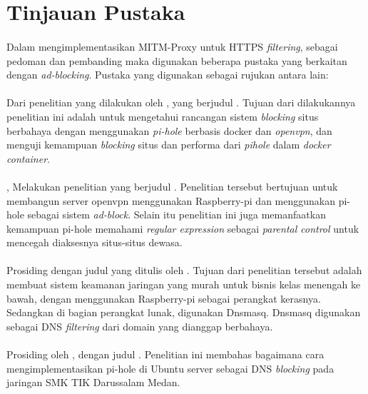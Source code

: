 \documentclass[./bab_2.tex]{subfiles}
\begin{document}
\section{Tinjauan Pustaka}
  \paragraph*{}Dalam mengimplementasikan MITM-Proxy untuk
  HTTPS \textit{filtering}, sebagai pedoman dan pembanding
  maka digunakan beberapa pustaka yang berkaitan dengan
  \textit{ad-blocking}. Pustaka yang digunakan sebagai
  rujukan antara lain:

  \paragraph*{} Dari penelitian yang dilakukan oleh
  \cite{uni2021}, yang berjudul .
  Tujuan dari dilakukannya penelitian ini adalah untuk
  mengetahui rancangan sistem \textit{blocking} situs
  berbahaya dengan menggunakan \textit{pi-hole} berbasis
  docker dan \textit{openvpn}, dan menguji kemampuan
  \textit{blocking} situs dan performa dari \textit{pihole}
  dalam \textit{docker container}.

  \paragraph*{} \cite{yusoff2020}, Melakukan penelitian yang
  berjudul \textit{}. Penelitian
  tersebut bertujuan untuk membangun server openvpn
  menggunakan Raspberry-pi dan menggunakan pi-hole sebagai
  sistem \textit{ad-block}. Selain itu penelitian ini juga
  memanfaatkan kemampuan pi-hole memahami \textit{regular
  expression} sebagai \textit{parental control} untuk
  mencegah diaksesnya situs-situs dewasa.

  \paragraph*{} Prosiding dengan judul
  \textit{}yang ditulis oleh
  \cite{sarath2020}. Tujuan dari penelitian tersebut adalah
  membuat sistem keamanan jaringan yang murah untuk bisnis
  kelas menengah ke bawah, dengan menggunakan Raspberry-pi
  sebagai perangkat kerasnya. Sedangkan di bagian perangkat
  lunak, digunakan Dnsmasq. Dnsmasq digunakan sebagai DNS
  \textit{filtering} dari domain yang dianggap berbahaya.

  \paragraph*{} Prosiding oleh \cite{wahyudi2020}, dengan
  judul . Penelitian ini membahas
  bagaimana cara mengimplementasikan pi-hole di Ubuntu
  server sebagai DNS \textit{blocking} pada jaringan SMK TIK
  Darussalam Medan.
\end{document}
